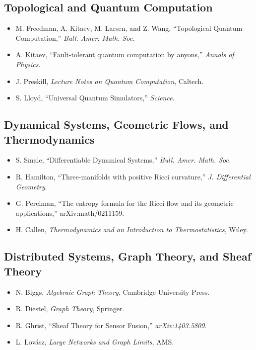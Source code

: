 \subsection*{Topological and Quantum Computation}

\begin{itemize}
\tightlist
\item M. Freedman, A. Kitaev, M. Larsen, and Z. Wang, ``Topological Quantum Computation,'' \emph{Bull. Amer. Math. Soc.}
\item A. Kitaev, ``Fault-tolerant quantum computation by anyons,'' \emph{Annals of Physics}.
\item J. Preskill, \emph{Lecture Notes on Quantum Computation}, Caltech.
\item S. Lloyd, ``Universal Quantum Simulators,'' \emph{Science}.
\end{itemize}

\subsection*{Dynamical Systems, Geometric Flows, and Thermodynamics}

\begin{itemize}
\tightlist
\item S. Smale, ``Differentiable Dynamical Systems,'' \emph{Bull. Amer. Math. Soc.}
\item R. Hamilton, ``Three-manifolds with positive Ricci curvature,'' \emph{J. Differential Geometry}.
\item G. Perelman, ``The entropy formula for the Ricci flow and its geometric applications,'' arXiv:math/0211159.
\item H. Callen, \emph{Thermodynamics and an Introduction to Thermostatistics}, Wiley.
\end{itemize}

\subsection*{Distributed Systems, Graph Theory, and Sheaf Theory}

\begin{itemize}
\tightlist
\item N. Biggs, \emph{Algebraic Graph Theory}, Cambridge University Press.
\item R. Diestel, \emph{Graph Theory}, Springer.
\item R. Ghrist, ``Sheaf Theory for Sensor Fusion,'' \emph{arXiv:1403.5809}.
\item L. Lovász, \emph{Large Networks and Graph Limits}, AMS.
\end{itemize}

